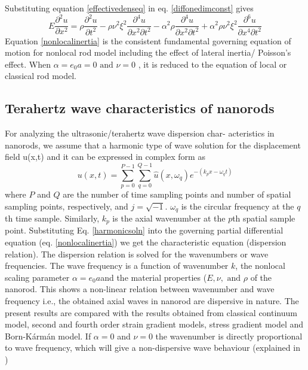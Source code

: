 Substituting equation \eqref{effectivedenseq} in eq. \eqref{diffonedimconst} gives\\
\begin{equation}
E \dfrac{\partial^2 u}{\partial x^2} = \rho \dfrac{\partial^2 u}{\partial t^2} - \rho \nu^2 \xi^2 \dfrac{\partial^4 u}{\partial x^2 \partial t^2} - \alpha^2 \rho \dfrac{\partial^4 u}{\partial x^2 \partial t^2} + \alpha^2 \rho \nu^2 \xi^2 \dfrac{\partial^6 u}{\partial x^4 \partial t^2}
\label{nonlocalinertia}
\end{equation}
Equation \eqref{nonlocalinertia} is the consistent fundamental governing equation of
motion for nonlocal rod model including the effect of lateral inertia/
Poisson’s effect. When $\alpha = e_0 a = 0\text{ and } \nu = 0$ , it is reduced to the equation of local or classical rod model.

\subsection*{Terahertz wave characteristics of nanorods}
For analyzing the ultrasonic/terahertz wave dispersion char-
acteristics in nanorods, we assume that a harmonic type of wave
solution for the displacement field u(x,t) and it can be expressed in
complex form as \cite{gopalakrishnan2008spectral,doyle1989wave}\\
\begin{equation}
u(x,t) = \sum_{p=0}^{P-1} \sum_{q=0}^{Q-1}\hat{u}(x,\omega_q)e^{-(k_p x - \omega_q t)}
\label{harmonicsoln}
\end{equation}
where $P$ and $Q$ are the number of time sampling points and number
of spatial sampling points, respectively, and $j=\sqrt{-1}$. $\omega_q$ is the
circular frequency at the $q$th time sample. Similarly, $k_p$ is the axial
wavenumber at the $p$th spatial sample point. Substituting Eq. \eqref{harmonicsoln} into the governing partial differential equation (eq. \eqref{nonlocalinertia}) we get
the characteristic equation (dispersion relation). The dispersion
relation is solved for the wavenumbers or wave frequencies. The
wave frequency is a function of wavenumber $k$, the nonlocal scaling
parameter $\alpha = e_0 a$and the material properties ($E, \nu,\text{ and } \rho$ of the
nanorod. This shows a non-linear relation between wavenumber
and wave frequency i.e., the obtained axial waves in nanorod are
dispersive in nature. The present results are compared with
the results obtained from classical continuum model, second and fourth order strain gradient models, stress gradient model and Born-K\'arm\'an model. If $\alpha = 0$ and $\nu = 0$ the wavenumber is directly
proportional to wave frequency, which will give a non-dispersive
wave behaviour (explained in \cite{doyle1989wave})

